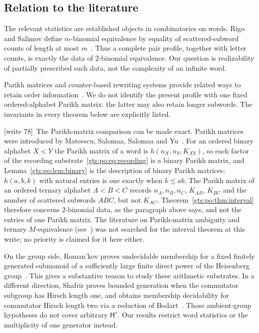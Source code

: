 \documentclass[11pt,letterpaper]{article}
\theoremstyle{definition}
\theoremstyle{remark}
\newcommand{\HH}{\mathsf H}
\newcommand{\wtagb}{\textup{[write 78]}}
\begin{document}
\subsection{Relation to the literature}\label{gts:po:sec:literature}
The relevant statistics are established objects in combinatorics on words. Rigo and Salimov define $m$-binomial equivalence by equality of scattered-subword counts of length at most $m$~\cite{po-rigo}. Thus a complete pair profile, together with letter counts, is exactly the data of $2$-binomial equivalence. Our question is realizability of partially prescribed such data, not the complexity of an infinite word.

Parikh matrices and counter-based rewriting systems provide related ways to retain order information~\cite{po-teh}. We do not identify the present profile with one fixed ordered-alphabet Parikh matrix: the latter may also retain longer subwords. The invariants in every theorem below are explicitly listed.

\wtagb\ The Parikh-matrix comparison can be made exact. Parikh matrices were introduced by Mateescu, Salomaa, Salomaa and Yu~\cite{mssy}. For an ordered binary alphabet $X<Y$ the Parikh matrix of a word is $h(n_X,n_Y,K_{XY})$, so each factor of the recording substrate~\eqref{gts:po:eq:recording} is a binary Parikh matrix, and Lemma~\ref{gts:po:lem:binary} is the description of binary Parikh matrices: $h(a,b,k)$ with natural entries is one exactly when $k\le ab$. The Parikh matrix of an ordered ternary alphabet $A<B<C$ records $n_A,n_B,n_C$, $K_{AB}$, $K_{BC}$ and the number of scattered subwords $ABC$, but not $K_{AC}$. Theorem~\ref{gts:po:thm:interval} therefore concerns $2$-binomial data, as the paragraph above says, and not the entries of one Parikh matrix. The literature on Parikh-matrix ambiguity and ternary $M$-equivalence (see~\cite{po-teh}) was not searched for the interval theorem at this write; no priority is claimed for it here either.

On the group side, Roman'kov proves undecidable membership for a fixed finitely generated submonoid of a sufficiently large finite direct power of the Heisenberg group~\cite{po-romankov}. This gives a substantive reason to study these arithmetic substrates. In a different direction, Shafrir proves bounded generation when the commutator subgroup has Hirsch length one, and obtains membership decidability for commutator Hirsch length two via a reduction of Bodart~\cite{po-shafrir}. Those ambient-group hypotheses do not cover arbitrary $\HH^r$. Our results restrict word statistics or the multiplicity of one generator instead.
\end{document}
